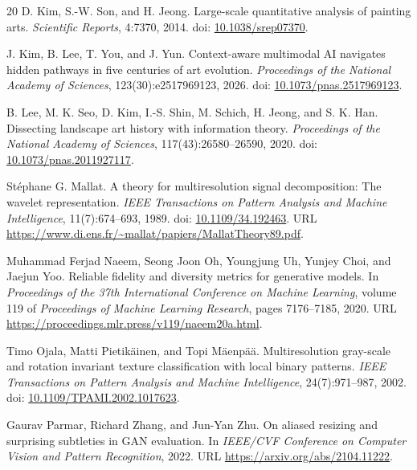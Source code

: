\documentclass[11pt,a4paper]{article}
\begin{document}
\begin{thebibliography}{20}
D. Kim, S.-W. Son, and H. Jeong.
Large-scale quantitative analysis of painting arts.
\textit{Scientific Reports}, 4:7370, 2014.
doi: \href{https://doi.org/10.1038/srep07370}{10.1038/srep07370}.

J. Kim, B. Lee, T. You, and J. Yun.
Context-aware multimodal AI navigates hidden pathways in five centuries of art evolution.
\textit{Proceedings of the National Academy of Sciences}, 123(30):e2517969123, 2026.
doi: \href{https://doi.org/10.1073/pnas.2517969123}{10.1073/pnas.2517969123}.

B. Lee, M. K. Seo, D. Kim, I.-S. Shin, M. Schich, H. Jeong, and S. K. Han.
Dissecting landscape art history with information theory.
\textit{Proceedings of the National Academy of Sciences}, 117(43):26580--26590, 2020.
doi: \href{https://doi.org/10.1073/pnas.2011927117}{10.1073/pnas.2011927117}.

Stéphane G. Mallat.
A theory for multiresolution signal decomposition: The wavelet representation.
\textit{IEEE Transactions on Pattern Analysis and Machine Intelligence}, 11(7):674--693, 1989.
doi: \href{https://doi.org/10.1109/34.192463}{10.1109/34.192463}.
URL \url{https://www.di.ens.fr/~mallat/papiers/MallatTheory89.pdf}.

Muhammad Ferjad Naeem, Seong Joon Oh, Youngjung Uh, Yunjey Choi, and Jaejun Yoo.
Reliable fidelity and diversity metrics for generative models.
In \textit{Proceedings of the 37th International Conference on Machine Learning}, volume 119 of \textit{Proceedings of Machine Learning Research}, pages 7176--7185, 2020.
URL \url{https://proceedings.mlr.press/v119/naeem20a.html}.

Timo Ojala, Matti Pietikäinen, and Topi Mäenpää.
Multiresolution gray-scale and rotation invariant texture classification with local binary patterns.
\textit{IEEE Transactions on Pattern Analysis and Machine Intelligence}, 24(7):971--987, 2002.
doi: \href{https://doi.org/10.1109/TPAMI.2002.1017623}{10.1109/TPAMI.2002.1017623}.

Gaurav Parmar, Richard Zhang, and Jun-Yan Zhu.
On aliased resizing and surprising subtleties in GAN evaluation.
In \textit{IEEE/CVF Conference on Computer Vision and Pattern Recognition}, 2022.
URL \url{https://arxiv.org/abs/2104.11222}.


\end{thebibliography}
\end{document}
